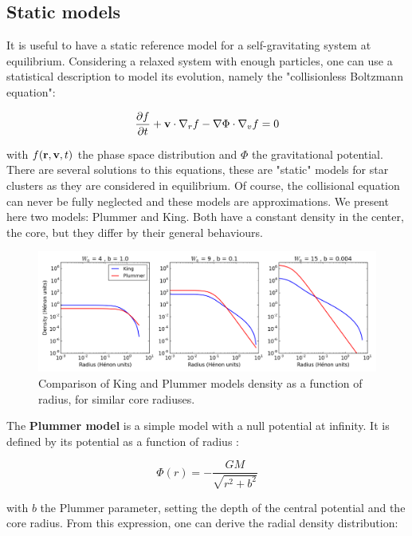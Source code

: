 \subsection{Static models}

It is useful to have a static reference model for a self-gravitating system at equilibrium. Considering a relaxed system with enough particles, one can use a statistical description to model its evolution, namely the "collisionless Boltzmann equation":

\begin{equation}
\frac{\partial f}{\partial t} + \bold{v} \cdot \nabla_r f - \nabla \Phi \cdot \nabla_v f = 0
\end{equation}

with $f(\bold{r},\bold{v},t)$ the phase space distribution and $\Phi$ the gravitational potential. There are several solutions to this equations, these are "static" models for star clusters as they are considered in equilibrium. Of course, the collisional equation can never be fully neglected and these models are approximations. We present here two models: Plummer and King. Both have a constant density in the center, the core, but they differ by their general behaviours. 


\begin{figure}
\center
\includegraphics[width=0.95\linewidth]{Figures/0_kingplummer.png}
\caption{Comparison of King and Plummer models density as a function of radius, for similar core radiuses.}
\label{Fig:0_plummerking}
\end{figure}


The \textbf{Plummer model} is a simple model with a null potential at infinity. It is defined by its potential as a function of radius \citep{BT}:

\begin{equation}
\Phi(r) = - \frac{G M}{\sqrt{r^2 + b^2}}
\end{equation}

with $b$ the Plummer parameter, setting the depth of the central potential and the core radius. From this expression, one can derive the radial density distribution:

